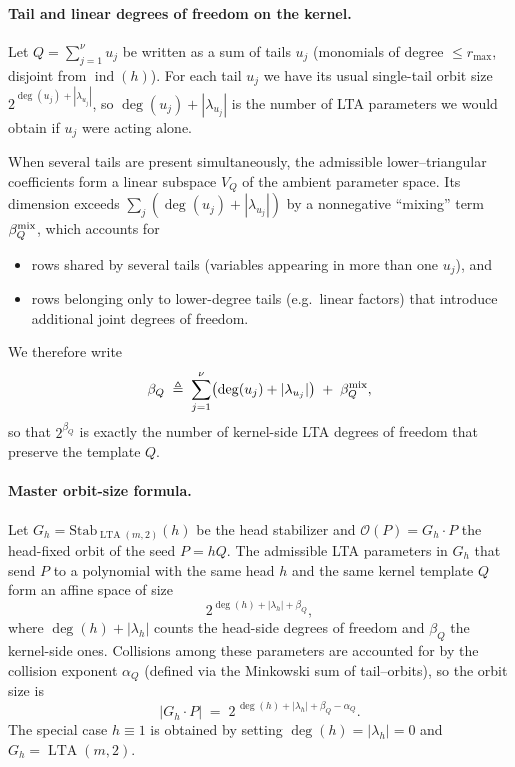 \documentclass[conference]{IEEEtran}
\theoremstyle{definition}
\DeclareMathOperator{\LTA}{LTA}
\newcommand{\ind}{\operatorname{ind}}
\begin{document}

\paragraph{Tail and linear degrees of freedom on the kernel.}
Let $Q=\sum_{j=1}^\nu u_j$ be written as a sum of tails $u_j$
(monomials of degree $\le r_{\max}$, disjoint from $\ind(h)$).  For each
tail $u_j$ we have its usual single-tail orbit size
$2^{\deg(u_j)+|\lambda_{u_j}|}$, so $\deg(u_j)+|\lambda_{u_j}|$ is the
number of LTA parameters we would obtain if $u_j$ were acting alone.

When several tails are present simultaneously, the admissible
lower--triangular coefficients form a linear subspace $V_Q$ of the
ambient parameter space.  Its dimension exceeds
$\sum_j (\deg(u_j)+|\lambda_{u_j}|)$ by a nonnegative “mixing” term
$\beta_Q^{\rm mix}$, which accounts for
\begin{itemize}
  \item rows shared by several tails (variables appearing in more than
        one $u_j$), and
  \item rows belonging only to lower-degree tails (e.g.\ linear factors)
        that introduce additional joint degrees of freedom.
\end{itemize}
We therefore write
\[
\beta_Q
  \;\triangleq\;
  \sum_{j=1}^\nu \bigl(\deg(u_j)+|\lambda_{u_j}|\bigr)
  \;+\;
  \beta_Q^{\rm mix},
\]
so that $2^{\beta_Q}$ is exactly the number of kernel-side LTA degrees
of freedom that preserve the template $Q$.




\paragraph{Master orbit-size formula.}
Let $G_h = \mathrm{Stab}_{\LTA(m,2)}(h)$ be the head stabilizer and
$\mathcal{O}(P)=G_h\cdot P$ the head-fixed orbit of the seed
$P=hQ$.  The admissible LTA parameters in $G_h$ that send $P$ to a
polynomial with the same head $h$ and the same kernel template $Q$
form an affine space of size
\[
2^{\deg(h)+|\lambda_h|+\beta_Q},
\]
where $\deg(h)+|\lambda_h|$ counts the head-side degrees of freedom and
$\beta_Q$ the kernel-side ones.  Collisions among these parameters are
accounted for by the collision exponent $\alpha_Q$ (defined via the
Minkowski sum of tail–orbits), so the orbit size is
\[
\boxed{
\bigl|G_h\cdot P\bigr|
  \;=\;
  2^{\,\deg(h)+|\lambda_h|+\beta_Q-\alpha_Q}.
}
\]
The special case
$h\equiv1$ is obtained by setting $\deg(h)=|\lambda_h|=0$ and
$G_h=\LTA(m,2)$.
\end{document}
